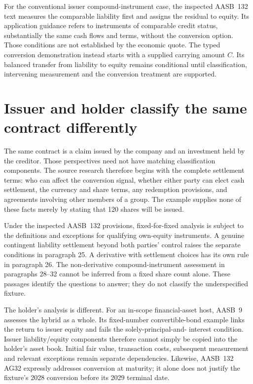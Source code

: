 For the conventional issuer compound-instrument case, the inspected
AASB~132 text measures the comparable liability first and assigns the residual
to equity. Its application guidance refers to instruments of comparable credit
status, substantially the same cash flows and terms, without the conversion
option\citep[paragraphs 31--32 and AG31]{aasb132}. Those conditions are not
established by the economic quote. The typed conversion demonstration instead
starts with a supplied carrying amount $C$. Its balanced transfer from liability
to equity remains conditional until classification, intervening measurement
and the conversion treatment are supported.

\section{Issuer and holder classify the same contract differently}
\label{sim:conversion-authority-scope}
The same contract is a claim issued by the company and an investment held by
the creditor. Those perspectives need not have matching classification
components. The source research therefore begins with the complete settlement
terms: who can affect the conversion signal, whether either party can elect
cash settlement, the currency and share terms, any redemption provisions, and
agreements involving other members of a group. The example supplies none of
these facts merely by stating that 120 shares will be issued.

Under the inspected AASB~132 provisions, fixed-for-fixed analysis is subject
to the definitions and exceptions for qualifying own-equity instruments.
A genuine contingent liability settlement beyond both parties' control raises
the separate conditions in paragraph 25. A derivative with settlement choices
has its own rule in paragraph 26. The non-derivative compound-instrument
assessment in paragraphs 28--32 cannot be inferred from a fixed share count
alone\citep[paragraphs 15--16, 22--26 and 28--32]{aasb132}. These passages identify
the questions to answer; they do not classify the underspecified fixture.

The holder's analysis is different. For an in-scope financial-asset host,
AASB~9 assesses the hybrid as a whole. Its fixed-number convertible-bond
example links the return to issuer equity and fails the solely-principal-and-
interest condition\citep[paragraphs 4.3.2 and B4.1.14, Instrument F]{aasb9scope2026}.
Issuer liability/equity components therefore cannot simply be copied into the
holder's asset book. Initial fair value, transaction costs, subsequent
measurement and relevant exceptions remain separate dependencies. Likewise,
AASB~132 AG32 expressly addresses conversion at maturity; it alone does not
justify the fixture's 2028 conversion before its 2029 terminal date.

